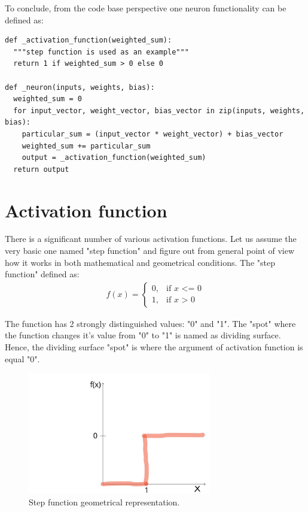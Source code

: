 \documentclass{article}
\begin{document}
To conclude, from the code base perspective one neuron functionality can be defined as:
\begin{lstlisting}
def _activation_function(weighted_sum):
  """step function is used as an example"""
  return 1 if weighted_sum > 0 else 0

def _neuron(inputs, weights, bias):
  weighted_sum = 0
  for input_vector, weight_vector, bias_vector in zip(inputs, weights, bias):
    particular_sum = (input_vector * weight_vector) + bias_vector
    weighted_sum += particular_sum
    output = _activation_function(weighted_sum)
  return output
\end{lstlisting}

      
\section{Activation function}
There is a significant number of various activation functions. Let us assume the very basic one named "step function" and figure out from general point of view how it works in both mathematical and geometrical conditions.   
The "step function" defined as:
\begin{align*}
f(x) = \begin{cases} 0, & \mbox{if } x\mbox{ <= 0} \\ 1, & \mbox{if } x\mbox{ > 0} \end{cases}
\end{align*}

The function has 2 strongly distinguished values: "0" and "1". The "spot" where the function changes it's value from "0" to "1" is named as dividing surface. Hence, the dividing surface "spot" is where the argument of activation function is equal "0".

\begin{figure}[h]
    \centering \includegraphics[width=8cm]{images/step_function.jpg}
    \caption {Step function geometrical representation.}
\end{figure}
\end{document}
